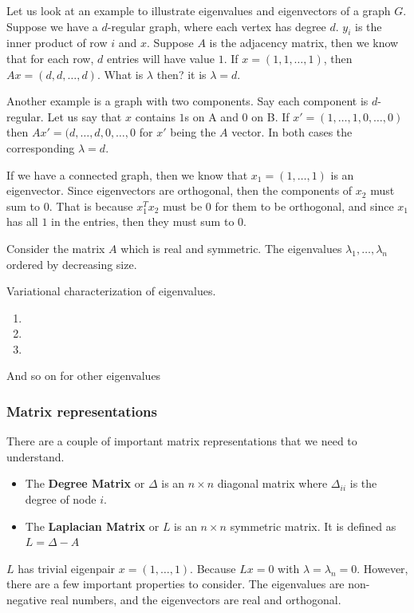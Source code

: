         Let us look at an example to illustrate eigenvalues and eigenvectors of a graph $G$. Suppose we have a $d$-regular graph, where each vertex has degree $d$. $y_i$ is the inner product of row $i$ and $x$. Suppose $A$ is the adjacency matrix, then we know that for each row, $d$ entries will have value $1$. If $x = (1, 1, \dots, 1)$, then $Ax = (d, d, \dots, d)$. What is $\lambda$ then? it is $\lambda = d$.
        
        Another example is a graph with two components. Say each component is $d$-regular. Let us say that $x$ contains $1$s on A and $0$ on B. If $x' = (1, \dots, 1, 0, \dots, 0)$ then $Ax' = (d, \dots, d, 0, \dots, 0$ for $x'$ being the $A$ vector. In both cases the corresponding $\lambda = d$. 
        
        If we have a connected graph, then we know that $x_1 = (1, \dots, 1)$ is an eigenvector. Since eigenvectors are orthogonal, then the components of $x_2$ must sum to $0$. That is because $x_1^T x_2$ must be $0$ for them to be orthogonal, and since $x_1$ has all $1$ in the entries, then they must sum to $0$. 
        
        Consider the matrix $A$ which is real and symmetric. The eigenvalues $\lambda_1, \dots, \lambda_n$ ordered by decreasing size. 
        
        \begin{defi}
        Variational characterization of eigenvalues.
        \begin{enumerate}
            \item {}
            \item {}
            \item {}
        \end{enumerate}
        And so on for other eigenvalues
        \end{defi}
        
\subsubsection{Matrix representations}
    There are a couple of important matrix representations that we need to understand. 
    \begin{itemize}
        \item The \textbf{Degree Matrix} or $\Delta$ is an $n \times n$ diagonal matrix where $\Delta_{ii}$ is the degree of node $i$. 
        \item The \textbf{Laplacian Matrix} or $L$ is an $n \times n$ symmetric matrix. It is defined as $L = \Delta - A$
    \end{itemize}
    $L$ has trivial eigenpair $x = (1, \dots, 1)$. Because $Lx = 0$ with $\lambda = \lambda_n = 0$. However, there are a few important properties to consider. The eigenvalues are non-negative real numbers, and the eigenvectors are real and orthogonal. 
    
